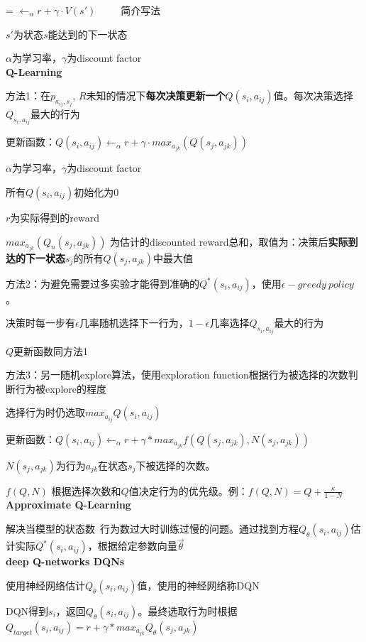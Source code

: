 \documentclass[UTF8]{ctexart}
\begin{document}
  \quad = $\leftarrow_{\alpha} r + \gamma \cdot V(s') $\ \ \ \ \ 简介写法
  
  \quad $s'$为状态$s$能达到的下一状态
  
  \quad $\alpha$为学习率，$\gamma$为discount factor\\
\textbf{Q-Learning}

  方法1：在$p_{a_{ij}, s_j}$, $R$未知的情况下\textbf{每次决策更新一个}$Q(s_i, a_{ij})$值。每次决策选择$Q_{s_i, a_{ij}}$最大的行为

  \quad 更新函数：$Q(s_i, a_{ij}) \leftarrow_{\alpha} r + \gamma \cdot max_{a_{jk}} (Q(s_j, a_{jk}))$

  \quad \quad $\alpha$为学习率，$\gamma$为discount factor

  \quad \quad 所有$Q(s_i, a_{ij})$初始化为0
  
  \quad \quad $r$为实际得到的reward

  \quad \quad $max_{a_{jk}} (Q_{n}(s_j, a_{jk}))$ 为估计的discounted reward总和，取值为：决策后\textbf{实际到达的下一状态}$s_j$的所有$Q(s_j, a_{jk})$中最大值

  方法2：为避免需要过多实验才能得到准确的$Q^*(s_i, a_{ij})$，使用$\epsilon-greedy\ policy$。
  
  \quad 决策时每一步有$\epsilon$几率随机选择下一行为，$1-\epsilon$几率选择$Q_{s_i, a_{ij}}$最大的行为

  \quad $Q$更新函数同方法1
  
  方法3：另一随机explore算法，使用exploration function根据行为被选择的次数判断行为被explore的程度
  
  \quad 选择行为时仍选取$max_{a_{ij}} Q(s_i, a_{ij})$
  
  \quad 更新函数：$Q(s_i, a_{ij}) \leftarrow_{\alpha} r + \gamma * max_{a_{jk}} f(Q(s_j, a_{jk}), N(s_j, a_{jk}))$
  
  \quad \quad $N(s_j, a_{jk})$为行为$a_{jk}$在状态$s_j$下被选择的次数。
  
  \quad \quad $f(Q, N)$ 根据选择次数和$Q$值决定行为的优先级。例：$f(Q, N) = Q + \frac{\kappa}{1 - N} $\\
\textbf{Approximate Q-Learning}

  解决当模型的状态数\ 行为数过大时训练过慢的问题。通过找到方程$Q_{\theta}(s_i, a_{ij})$估计实际$Q^*(s_i, a_{ij})$，根据给定参数向量$\vec{\theta}$\\
\textbf{deep Q-networks DQNs}

  使用神经网络估计$Q_{\theta}(s_i, a_{ij})$值，使用的神经网络称DQN
  
  DQN得到$s_i$，返回$Q_{\theta}(s_i, a_{ij})$。最终选取行为时根据$Q_{target}(s_i, a_{ij}) = r + \gamma * max_{a_{jk}} Q_{\theta}(s_j, a_{jk})$
\end{document}
